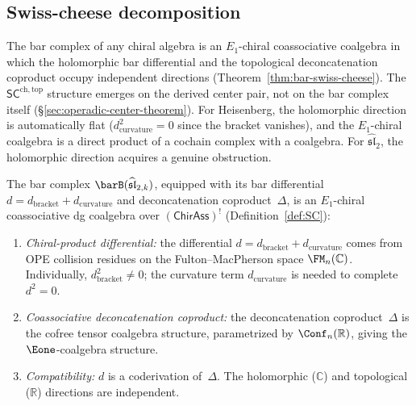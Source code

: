 \subsection{Swiss-cheese decomposition}
\label{subsec:rosetta-swiss-cheese}

The bar complex of any chiral algebra is an $E_1$-chiral
coassociative coalgebra in which the holomorphic bar differential
and the topological deconcatenation coproduct occupy independent
directions (Theorem~\ref{thm:bar-swiss-cheese}). The
$\mathsf{SC}^{\mathrm{ch,top}}$ structure emerges on the derived
center pair, not on the bar complex itself
(\S\ref{sec:operadic-center-theorem}). For Heisenberg, the
holomorphic direction is automatically flat
($d_{\mathrm{curvature}}^2 = 0$ since the bracket vanishes), and
the $E_1$-chiral coalgebra is a direct product of a cochain complex
with a coalgebra. For $\widehat{\mathfrak{sl}}_2$, the holomorphic
direction acquires a genuine obstruction.

\begin{theorem}
\label{thm:rosetta-sl2-swiss}
The bar complex $\barB(\widehat{\mathfrak{sl}}_{2,k})$, equipped
with its bar differential $d = d_{\mathrm{bracket}}
+ d_{\mathrm{curvature}}$ and deconcatenation coproduct~$\Delta$,
is an $E_1$-chiral coassociative dg coalgebra over
$(\mathsf{ChirAss})^!$
\textup{(Definition~\ref{def:SC})}:
\begin{enumerate}[label=\textup{(\roman*)}]
\item \emph{Chiral-product differential\textup{:}} the differential
 $d = d_{\mathrm{bracket}} + d_{\mathrm{curvature}}$
 comes from OPE collision residues on the Fulton--MacPherson space $\FM_n(\mathbb{C})$.
 Individually, $d_{\mathrm{bracket}}^2 \neq 0$; the curvature term
 $d_{\mathrm{curvature}}$ is needed to complete
 $d^2 = 0$.
\item \emph{Coassociative deconcatenation coproduct\textup{:}} the deconcatenation
 coproduct~$\Delta$ is the cofree tensor coalgebra structure, parametrized by $\Conf_n(\mathbb{R})$,
 giving the $\Eone$-coalgebra structure.
\item \emph{Compatibility\textup{:}} $d$ is a coderivation
 of~$\Delta$. The holomorphic ($\mathbb{C}$) and topological
 ($\mathbb{R}$) directions are independent.
\end{enumerate}
\end{theorem}

